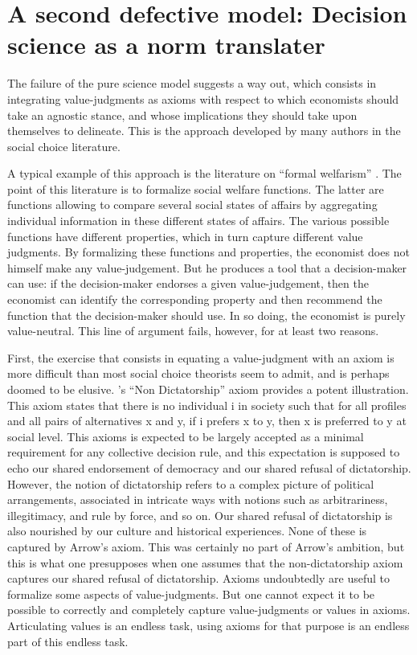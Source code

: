 \documentclass[preprint,11pt]{elsarticle}
\begin{document}
\section{A second defective model: Decision science as a norm translater}
\noindent The failure of the pure science model suggests a way out, which consists in integrating value-judgments as axioms with respect to which economists should take an agnostic stance, and whose implications they should take upon themselves to delineate. This is the approach developed by many authors in the social choice literature.

A typical example of this approach is the literature on ``formal welfarism'' \cite{fleurbaey_informational_2003}. The point of this literature is to formalize social welfare functions. The latter are functions allowing to compare several social states of affairs by aggregating individual information in these different states of affairs. The various possible functions have different properties, which in turn capture different value judgments. By formalizing these functions and properties, the economist does not himself make any value-judgement. But he produces a tool that a decision-maker can use: if the decision-maker endorses a given value-judgement, then the economist can identify the corresponding property and then recommend the function that the decision-maker should use. In so doing, the economist is purely value-neutral. This line of argument fails, however, for at least two reasons.

First, the exercise that consists in equating a value-judgment with an axiom is more difficult than most social choice theorists seem to admit, and is perhaps doomed to be elusive. \cite{arrow_social_2012}'s “Non Dictatorship” axiom provides a potent illustration. This axiom states that there is no individual i in society such that for all profiles and all pairs of alternatives x and y, if i prefers x to y, then x is preferred to y at social level. This axioms is expected to be largely accepted as a minimal requirement for any collective decision rule, and this expectation is supposed to echo our shared endorsement of democracy and our shared refusal of dictatorship. However, the notion of dictatorship refers to a complex picture of political arrangements, associated in intricate ways with notions such as arbitrariness, illegitimacy, and rule by force, and so on. Our shared refusal of dictatorship is also nourished by our culture and historical experiences. None of these is captured by Arrow’s axiom. This was certainly no part of Arrow’s ambition, but this is what one presupposes when one assumes that the non-dictatorship axiom captures our shared refusal of dictatorship. Axioms undoubtedly are useful to formalize some aspects of value-judgments. But one cannot expect it to be possible to correctly and completely capture value-judgments or values in axioms. Articulating values is an endless task, using axioms for that purpose is an endless part of this endless task.
\end{document}
